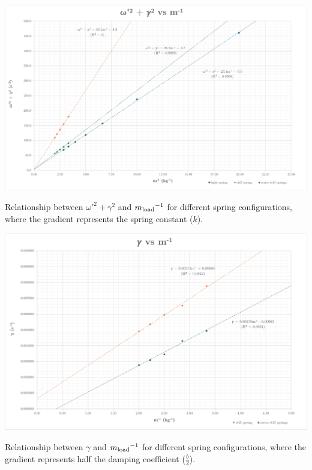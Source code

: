 \clearpage
\onecolumn

\begin{graph}[H]
    \centering
    \includegraphics[width=1\textwidth]{images/graph1.pdf}
    \caption{Relationship between $\omega'^2 + \gamma^2$ and ${m{\textsubscript{load}}}^{-1}$ for different spring configurations, where the gradient represents the spring constant ($k$).}
\end{graph}

\begin{graph}[H]
    \centering
    \includegraphics[width=1\textwidth]{images/graph2.pdf}
    \caption{Relationship between $\gamma$ and ${m{\textsubscript{load}}}^{-1}$ for different spring configurations, where the gradient represents half the damping coefficient ($\tfrac{b}{2}$).}
\end{graph}

\twocolumn

